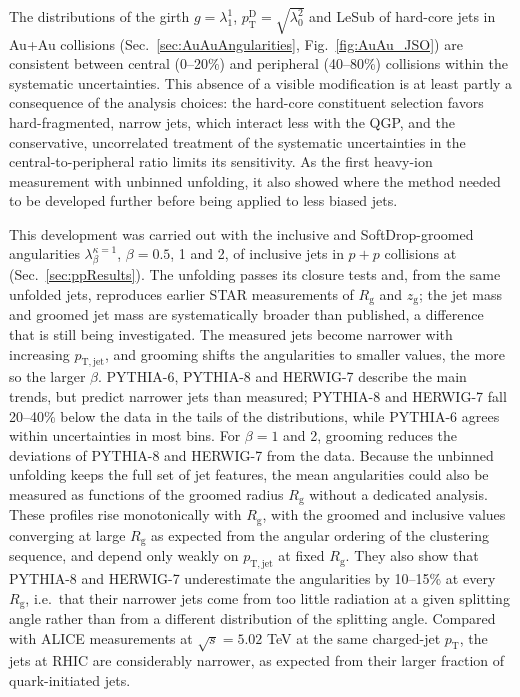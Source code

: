 The distributions of the girth \(g = \lambda_1^1\), \(p_\mathrm{T}^\mathrm{D} = \sqrt{\lambda_0^2}\) and LeSub of hard-core jets in Au+Au collisions (Sec.~\ref{sec:AuAuAngularities}, Fig.~\ref{fig:AuAu_JSO}) are consistent between central (0--20\%) and peripheral (40--80\%) collisions within the systematic uncertainties.
%
This absence of a visible modification is at least partly a consequence of the analysis choices: the hard-core constituent selection favors hard-fragmented, narrow jets, which interact less with the QGP, and the conservative, uncorrelated treatment of the systematic uncertainties in the central-to-peripheral ratio limits its sensitivity.
%
As the first heavy-ion measurement with unbinned unfolding, it also showed where the method needed to be developed further before being applied to less biased jets.

This development was carried out with the inclusive and SoftDrop-groomed angularities \(\lambda^{\kappa=1}_{\beta}\), \(\beta = 0.5\), 1 and 2, of inclusive jets in \(p+p\) collisions at  (Sec.~\ref{sec:ppResults}).
%
The unfolding passes its closure tests and, from the same unfolded jets, reproduces earlier STAR measurements of \(R_\mathrm{g}\) and \(z_\mathrm{g}\); the jet mass and groomed jet mass are systematically broader than published, a difference that is still being investigated.
%
The measured jets become narrower with increasing \(p_\mathrm{T, jet}\), and grooming shifts the angularities to smaller values, the more so the larger \(\beta\).
%
PYTHIA\mbox{-}6, PYTHIA\mbox{-}8 and HERWIG\mbox{-}7 describe the main trends, but predict narrower jets than measured; PYTHIA\mbox{-}8 and HERWIG\mbox{-}7 fall 20--40\% below the data in the tails of the distributions, while PYTHIA\mbox{-}6 agrees within uncertainties in most bins.
%
For \(\beta = 1\) and 2, grooming reduces the deviations of PYTHIA\mbox{-}8 and HERWIG\mbox{-}7 from the data.
%
Because the unbinned unfolding keeps the full set of jet features, the mean angularities could also be measured as functions of the groomed radius \(R_\mathrm{g}\) without a dedicated analysis.
%
These profiles rise monotonically with \(R_\mathrm{g}\), with the groomed and inclusive values converging at large \(R_\mathrm{g}\) as expected from the angular ordering of the clustering sequence, and depend only weakly on \(p_\mathrm{T, jet}\) at fixed \(R_\mathrm{g}\).
%
They also show that PYTHIA\mbox{-}8 and HERWIG\mbox{-}7 underestimate the angularities by 10--15\% at every \(R_\mathrm{g}\), i.e.\ that their narrower jets come from too little radiation at a given splitting angle rather than from a different distribution of the splitting angle.
%
Compared with ALICE measurements at \(\sqrt{s} = 5.02\) TeV at the same charged-jet \(p_\mathrm{T}\), the jets at RHIC are considerably narrower, as expected from their larger fraction of quark-initiated jets.

